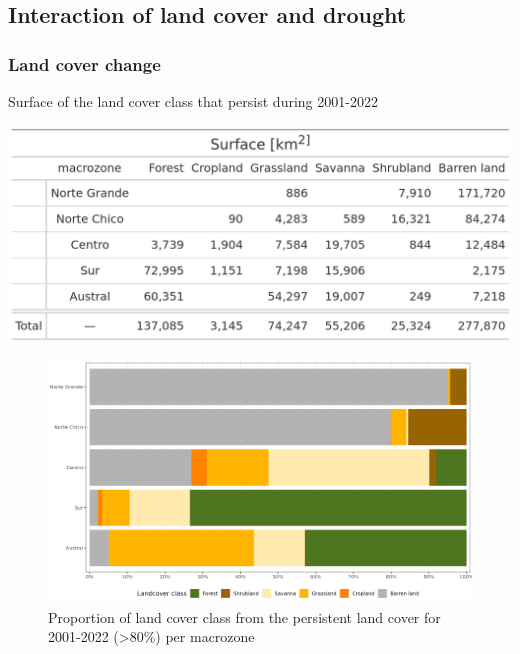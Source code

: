 \documentclass[
  authoryear,
  preprint,
  3p,
  onecolumn]{elsarticle}
\begin{document}
\hypertarget{interaction-of-land-cover-and-drought-1}{%
\subsection{Interaction of land cover and
drought}\label{interaction-of-land-cover-and-drought-1}}

\hypertarget{land-cover-change-1}{%
\subsubsection{Land cover change}\label{land-cover-change-1}}

\begin{table}[!ht]
\caption{Surface of the land cover class that persist during 2001-2022}
\label{tab-landcoverSurf}
\includegraphics[width = .5\textwidth]{../output/figs/table_surface_landcover_macrozone.png}
\end{table}

\begin{figure}[!ht]

{\centering \includegraphics{../output/figs/LC_pers80_per_macrozone.png}

}

\caption{\label{fig-LCprop}Proportion of land cover class from the
persistent land cover for 2001-2022 (\textgreater80\%) per macrozone}

\end{figure}
\end{document}

